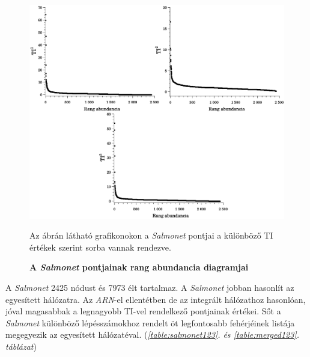 \documentclass[a4paper,12pt]{article}
\newenvironment{imgdesc}{
		\small
		\singlespacing
		\begin{center}

	}{
		\end{center}
	}
\begin{document}
			\begin{figure}[H]
					\includegraphics[scale=0.44]{img/salmonet_tis.pdf}
					\centering
					\caption{ \textbf{A \textit{Salmonet} pontjainak rang abundancia diagramjai}}
					\begin{imgdesc}
						Az ábrán látható grafikonokon a \textit{Salmonet} pontjai a különböző TI értékek szerint sorba vannak rendezve.
					\end{imgdesc}

					\label{fig:salmonet_stats}
				\end{figure}

			A \textit{Salmonet} 2425 nódust és 7973 élt tartalmaz. A \textit{Salmonet} jobban hasonlít az egyesített hálózatra. Az \textit{ARN}-el ellentétben de az integrált hálózathoz hasonlóan, jóval  magasabbak a legnagyobb TI-vel rendelkező pontjainak értékei. Sőt a \textit{Salmonet} különböző lépésszámokhoz rendelt öt legfontosabb fehérjéinek listája megegyezik az egyesített hálózatéval. (\textit{\ref{table:salmonet123}. és \ref{table:merged123}. táblázat})
\end{document}
